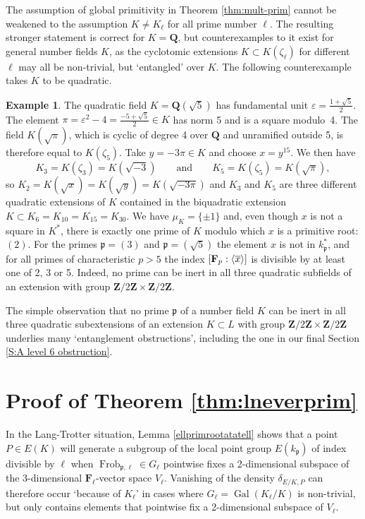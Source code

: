 \documentclass{amsart}
\theoremstyle{plain}
\theoremstyle{definition}
\newtheorem{example}[theorem]{Example}
\DeclareMathOperator{\Frob}{Frob}
\DeclareMathOperator{\Gal}{Gal}
\newcommand{\FF}{{\mathbf{F}}}
\newcommand{\Que}{{\mathbf{Q}}}
\newcommand{\Zee}{{\mathbf{Z}}}
\newcommand{\gothp}{{\mathfrak{p}}}
\newcommand{\mybar}[1]{
  \mathchoice
  {#1\llap{$\overline{\phantom{\displaystyle\rm#1}}$}}
  {#1\llap{$\overline{\phantom{\textstyle\rm#1}}$}}
  {#1\llap{$\overline{\phantom{\scriptstyle\rm#1}}$}}
  {#1\llap{$\overline{\phantom{\scriptscriptstyle\rm#1}}$}}
}
\renewcommand{\bar}{\mybar}
\begin{document}
\noindent
The assumption of global primitivity in Theorem \ref{thm:mult-prim}
cannot be weakened to the assumption $K\ne K_\ell$ for all prime number $\ell$.
The resulting stronger statement is correct for $K=\Que$, 
but counterexamples to it exist for general number fields $K$, 
as the cyclotomic extensions $K\subset K(\zeta_\ell)$ for different $\ell$ may all be non-trivial, but `entangled' over $K$.
The following counterexample takes $K$ to be quadratic.
\begin{example}
\label{ex:counterexample}
The quadratic field $K=\Que(\sqrt 5)$ has 
fundamental unit  $\varepsilon=\frac{1+\sqrt 5}{2}$.
The element $\pi=\varepsilon^2-4=\frac{-5+\sqrt 5}{2}\in K$
has norm 5 and is a square modulo~4.
The field $K(\sqrt\pi)$, which is cyclic of degree 4 
over $\Que$ and unramified outside 5, is therefore equal to $K(\zeta_5)$.
Take $y=-3\pi\in K$ and choose $x=y^{15}$.
We then have 
\[
K_3=K(\zeta_3)=K(\sqrt{-3})\qquad\text{and}\qquad
K_5=K(\zeta_5)=K(\sqrt\pi),
\]
so $K_2=K(\sqrt x)=K(\sqrt y)=K(\sqrt{-3\pi})$ and $K_3$ 
and $K_5$ are three different quadratic extensions of $K$ contained in 
the biquadratic extension $K\subset K_6=K_{10}=K_{15}=K_{30}$.
We have $\mu_K=\{\pm1\}$ and, even though $x$ is not a 
square in $K^*$, there is exactly one prime of $K$ 
modulo which $x$ is a primitive root: $(2)$.
For the primes $\gothp=(3)$ and $\gothp=(\sqrt 5)$ 
the element $x$ is not in $k_\gothp^*$, and 
for all primes of characteristic $p>5$
the index $[\FF_p:\langle\bar x\rangle]$ is divisible by at least one of 2, 3 or 5.
Indeed, no prime can be inert in all three quadratic subfields of 
an extension with group $\Zee/2\Zee\times\Zee/2\Zee$.
\end{example}

\medskip\noindent
The simple observation that no prime $\gothp$ of a number field $K$ can be inert in all three quadratic subextensions of an extension $K\subset L$ with group $\Zee/2\Zee\times\Zee/2\Zee$ underlies many `entanglement obstructions', including the one in our 
final Section \ref{S:A level 6 obstruction}.
\section{Proof of Theorem \ref{thm:lneverprim}}
\label{S:Proof of Theorem 1.2}

\noindent
In the Lang-Trotter situation, 
Lemma \ref{ellprimrootatatell} shows that
a point $P\in E(K)$ will generate a subgroup 
of the local point group $E(k_\gothp)$ of index 
divisible by $\ell$ when $\Frob_{\gothp, \ell}\in G_\ell$
pointwise fixes a 2-dimensional subspace of 
the 3-dimensional $\FF_\ell$-vector space $V_\ell$.
Vanishing of the density $\delta_{E/K,P}$ can therefore occur 
`because of $K_\ell$' in cases where 
$G_\ell=\Gal(K_\ell/K)$ is non-trivial, 
but only contains elements that pointwise fix
a 2-dimensional subspace of $V_\ell$.
\end{document}
